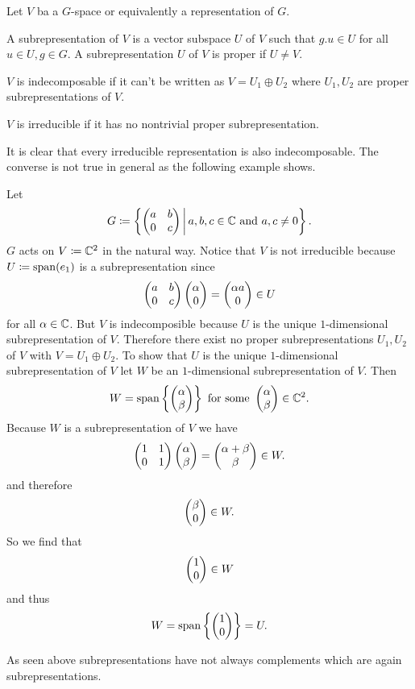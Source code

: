 \begin{defi}
  Let $V$ ba a $G$-space or equivalently a representation of $G$.

  A subrepresentation of $V$ is a vector subspace $U$ of $V$ such that $g.u \in U$ for all $u \in U, g \in G$. A subrepresentation $U$ of $V$ is proper if $U \neq V$.
  
  $V$ is indecomposable if it can’t be written as $V = U_1 \oplus U_2$ where $U_1, U_2$ are proper subrepresentations of $V$.
  
  $V$ is irreducible if it has no nontrivial proper subrepresentation.
\end{defi}

It is clear that every irreducible representation is also indecomposable. The converse is not true in general as the following example shows.

\begin{expl}
 Let
 \[
  G \coloneqq \left\{ \begin{pmatrix}a&b\\0&c\end{pmatrix} \,\middle|\, a,b,c \in \mathbb{C} \text{ and } a, c \neq 0 \right\}.
 \]
 $G$ acts on $V \coloneqq \mathbb{C}^2$ in the natural way. Notice that $V$ is not irreducible because $U \coloneqq \operatorname{span}(e_1)$ is a subrepresentation since
 \[
  \begin{pmatrix}a&b\\0&c\end{pmatrix} \begin{pmatrix}\alpha\\0\end{pmatrix} = \begin{pmatrix}\alpha a\\0\end{pmatrix} \in U
 \]
 for all $\alpha \in \mathbb{C}$. But $V$ is indecomposible because $U$ is the unique $1$-dimensional subrepresentation of $V$.  Therefore there exist no proper subrepresentations $U_1, U_2$ of $V$ with $V = U_1 \oplus U_2$. To show that $U$ is the unique $1$-dimensional subrepresentation of $V$ let $W$ be an $1$-dimensional subrepresentation of $V$. Then
 \[
  W = \operatorname{span}\left\{ \begin{pmatrix}\alpha\\\beta\end{pmatrix} \right\} \text{ for some } \begin{pmatrix}\alpha\\\beta\end{pmatrix} \in \mathbb{C}^2.
 \]
 Because $W$ is a subrepresentation of $V$ we have
 \[
  \begin{pmatrix}1&1\\0&1\end{pmatrix} \begin{pmatrix}\alpha\\\beta\end{pmatrix} = \begin{pmatrix}\alpha+\beta\\\beta\end{pmatrix} \in W.
 \]
 and therefore
 \[
  \begin{pmatrix}\beta\\0\end{pmatrix} \in W.
 \]
 So we find that
 \[
  \begin{pmatrix}1\\0\end{pmatrix} \in W
 \]
 and thus
 \[
  W = \operatorname{span}\left\{\begin{pmatrix}1\\0\end{pmatrix}\right\} = U.
 \]
\end{expl}


\begin{warn}
 As seen above subrepresentations have not always complements which are again subrepresentations.
\end{warn}





